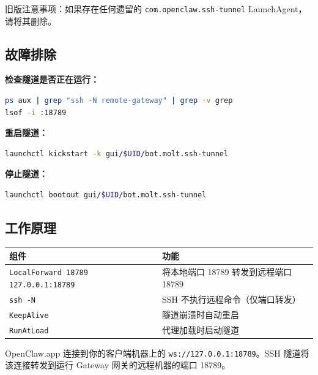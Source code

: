 旧版注意事项：如果存在任何遗留的 \texttt{com.openclaw.ssh-tunnel} LaunchAgent，请将其删除。

\hrulefill


\subsection{故障排除}


\textbf{检查隧道是否正在运行：}

\begin{lstlisting}[language=bash]
ps aux | grep "ssh -N remote-gateway" | grep -v grep
lsof -i :18789
\end{lstlisting}


\textbf{重启隧道：}

\begin{lstlisting}[language=bash]
launchctl kickstart -k gui/$UID/bot.molt.ssh-tunnel
\end{lstlisting}


\textbf{停止隧道：}

\begin{lstlisting}[language=bash]
launchctl bootout gui/$UID/bot.molt.ssh-tunnel
\end{lstlisting}


\hrulefill


\subsection{工作原理}



\begin{table}[h]
\centering
\small
\begin{tabular}{|l|l|}
\hline
组件 & 功能 \\
\hline
\texttt{LocalForward 18789 127.0.0.1:18789} & 将本地端口 18789 转发到远程端口 18789 \\
\hline
\texttt{ssh -N} & SSH 不执行远程命令（仅端口转发） \\
\hline
\texttt{KeepAlive} & 隧道崩溃时自动重启 \\
\hline
\texttt{RunAtLoad} & 代理加载时启动隧道 \\
\hline
\end{tabular}
\end{table}



OpenClaw.app 连接到你的客户端机器上的 \texttt{ws://127.0.0.1:18789}。SSH 隧道将该连接转发到运行 Gateway 网关的远程机器的端口 18789。


\clearpage


